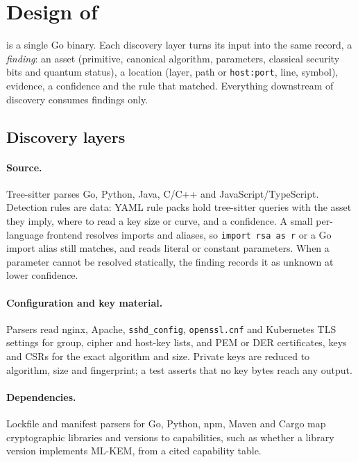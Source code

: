 \section{Design of \tool{}}
\label{sec:design}

\tool{} is a single Go binary. Each discovery layer turns its input into the
same record, a \emph{finding}: an asset (primitive, canonical algorithm,
parameters, classical security bits and quantum status), a location (layer,
path or \texttt{host:port}, line, symbol), evidence, a confidence and the rule
that matched. Everything downstream of discovery consumes findings only.

\subsection{Discovery layers}

\paragraph{Source.} Tree-sitter parses Go, Python, Java, C/C++ and
JavaScript/\allowbreak TypeScript. Detection rules are data: YAML rule packs hold
tree-sitter queries with the asset they imply, where to read a key size or
curve, and a confidence. A small per-language frontend resolves imports and
aliases, so \texttt{import rsa as r} or a Go import alias still matches, and
reads literal or constant parameters. When a parameter cannot be resolved
statically, the finding records it as unknown at lower confidence.

\paragraph{Configuration and key material.} Parsers read nginx, Apache,
\texttt{sshd\_config}, \texttt{openssl.cnf} and Kubernetes TLS settings for
group, cipher and host-key lists, and PEM or DER certificates, keys and CSRs
for the exact algorithm and size. Private keys are reduced to algorithm, size
and fingerprint; a test asserts that no key bytes reach any output.

\paragraph{Dependencies.} Lockfile and manifest parsers for Go, Python, npm,
Maven and Cargo map cryptographic libraries and versions to capabilities, such
as whether a library version implements ML-KEM, from a cited capability table.

